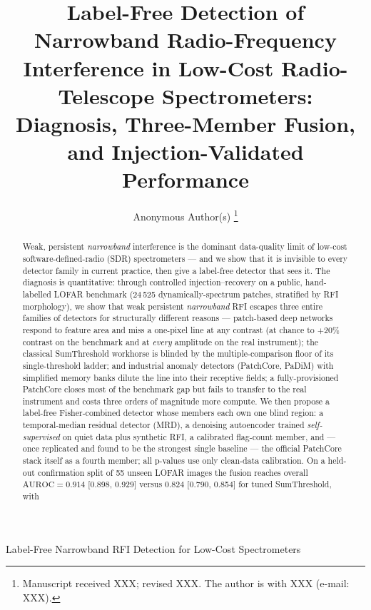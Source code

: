 \documentclass[journal]{IEEEtran}
\newcommand{\auroc}{\mathrm{AUROC}}
\begin{document}
\title{Label-Free Detection of Narrowband Radio-Frequency Interference in
Low-Cost Radio-Telescope Spectrometers: Diagnosis, Three-Member Fusion, and
Injection-Validated Performance}

\author{%
Anonymous Author(s)%
\thanks{Manuscript received XXX; revised XXX. %
The author is with XXX (e-mail: XXX).}}

%
{Label-Free Narrowband RFI Detection for Low-Cost Spectrometers}

\maketitle

\begin{abstract}
Weak, persistent \emph{narrowband} interference is the dominant data-quality
limit of low-cost software-defined-radio (SDR) spectrometers --- and we show
that it is invisible to every detector family in current practice, then give a
label-free detector that sees it.  The diagnosis is quantitative: through controlled injection--recovery on a public, hand-labelled
LOFAR benchmark (24\,525 dynamically-spectrum patches, stratified by RFI
morphology), we show that weak persistent \emph{narrowband} RFI escapes three
entire families of detectors for structurally different reasons --- patch-based
deep networks respond to feature area and miss a one-pixel line at any
contrast (at chance to $+20\%$ contrast on the benchmark and at
\emph{every} amplitude on the real instrument); the classical
SumThreshold workhorse is blinded by the multiple-comparison floor of its
single-threshold ladder; and industrial anomaly detectors (PatchCore, PaDiM) with simplified
memory banks dilute the line into their receptive fields; a
fully-provisioned PatchCore closes most of the benchmark gap but
fails to transfer to the real instrument and costs three orders of
magnitude more compute.  We then propose a label-free
Fisher-combined detector whose members each own one blind region: a
temporal-median residual detector (MRD), a denoising autoencoder trained
\emph{self-supervised} on quiet data plus synthetic RFI, a calibrated
flag-count member, and --- once replicated and found to be the strongest
single baseline --- the official PatchCore stack itself as a fourth
member; all p-values use only clean-data calibration.  On a held-out confirmation split of 55 unseen LOFAR
images the fusion reaches overall $\auroc = 0.914$
[0.898, 0.929] versus $0.824$ [0.790, 0.854] for tuned SumThreshold, with

\end{abstract}
\end{document}
